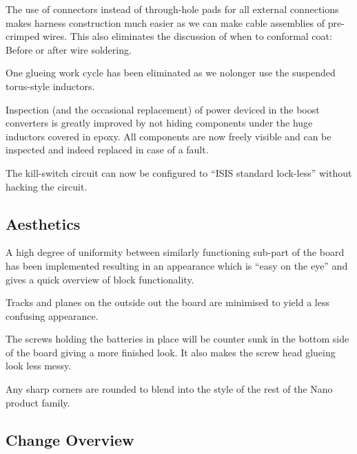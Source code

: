 \documentclass[9pt,a4paper]{article}
\begin{document}
The use of connectors instead of through-hole pads for all external
connections makes harness construction much easier as we can make cable
assemblies of pre-crimped wires. This also eliminates the discussion of
when to conformal coat: Before or after wire soldering.

One glueing work cycle has been eliminated as we nolonger use the
suspended torus-style inductors.

Inspection (and the occasional replacement) of power deviced in the
boost converters is greatly improved by not hiding components under the
huge inductors covered in epoxy. All components are now freely visible
and can be inspected and indeed replaced in case of a fault.

The kill-switch circuit can now be configured to ``ISIS standard
lock-less'' without hacking the circuit.

\subsection{Aesthetics}

A high degree of uniformity between similarly functioning sub-part of
the board has been implemented resulting in an appearance which is
``easy on the eye'' and gives a quick overview of block functionality.

Tracks and planes on the outside out the board are minimised to yield a
less confusing appearance.

The screws holding the batteries in place will be counter sunk in the
bottom side of the board giving a more finished look. It also makes the
screw head glueing look less messy.

Any sharp corners are rounded to blend into the style of the rest of the
Nano product family.

\subsection{Change Overview}
\end{document}
